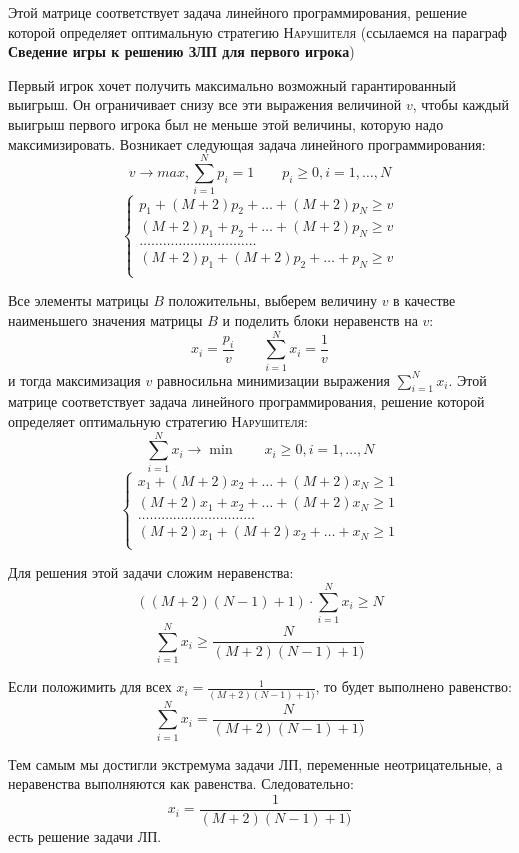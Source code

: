 \documentclass[aps,%
12pt,%
final,%
oneside,
onecolumn,%
musixtex, %
superscriptaddress,%
centertags]{article} %
\theoremstyle{plain}
\theoremstyle{definition}
\theoremstyle{remark}
\begin{document}
Этой матрице соответствует задача линейного программирования, решение которой определяет оптимальную стратегию \textsc{Нарушителя} (ссылаемся на параграф \textbf{Сведение игры к решению ЗЛП для первого игрока})

Первый игрок хочет получить максимально возможный гарантированный выигрыш. Он ограничивает снизу все эти выражения величиной $v$, чтобы каждый выигрыш первого игрока был не меньше этой величины, которую надо максимизировать. Возникает следующая задача линейного программирования:
$$v \to max, \sum\limits_{i=1}^N p_i = 1 \qquad p_i \geq 0, i = 1,\ldots,N$$
$$\begin{cases}
  p_1 + (M+2)p_2 + \ldots + (M+2)p_N \geq v \\ 
 (M+2)p_1 + p_2 + \ldots + (M+2)p_N \geq v \\ 
  \ldots \ldots \ldots \ldots \ldots\ldots \ldots \ldots \ldots \ldots  \\
  (M+2)p_1 + (M+2) p_2 + \ldots + p_N \geq v \\ 
\end{cases}$$

Все элементы матрицы $B$ положительны, выберем величину $v$ в качестве наименьшего значения матрицы $B$ и поделить блоки неравенств на $v$:
$$x_i = \frac{p_i}{v} \qquad \sum\limits_{i=1}^N x_i = \frac{1}{v}$$
и тогда максимизация $v$ равносильна минимизации выражения $\sum\limits_{i=1}^N x_i $. Этой матрице соответствует задача линейного программирования, решение которой определяет оптимальную стратегию \textsc{Нарушителя}:
$$\sum\limits_{i=1}^N x_i \to \min \qquad x_i \geq 0, i = 1,\ldots,N$$
$$\begin{cases}
  x_1 + (M+2)x_2 + \ldots + (M+2)x_N \geq 1 \\ 
 (M+2)x_1 + x_2 + \ldots + (M+2)x_N \geq 1 \\ 
  \ldots \ldots \ldots \ldots \ldots\ldots \ldots \ldots \ldots \ldots  \\
  (M+2)x_1 + (M+2) x_2 + \ldots + x_N \geq 1 \\ 
\end{cases}$$

Для решения этой задачи сложим неравенства:
$$((M+2)(N-1)+1) \cdot \sum\limits_{i=1}^N x_i \geq N$$
$$\sum\limits_{i=1}^N x_i \geq \frac{N}{(M+2)(N-1)+1)}$$

Если положимить для всех $x_i = \frac{1}{(M+2)(N-1)+1)} $, то будет выполнено равенство:
$$\sum\limits_{i=1}^N x_i  =  \frac{N}{(M+2)(N-1)+1)}$$

Тем самым мы достигли экстремума задачи ЛП, переменные неотрицательные, а неравенства выполняются как равенства. Следовательно:
$$x_i = \frac{1}{(M+2)(N-1)+1)}$$
есть решение задачи ЛП.
\end{document}
